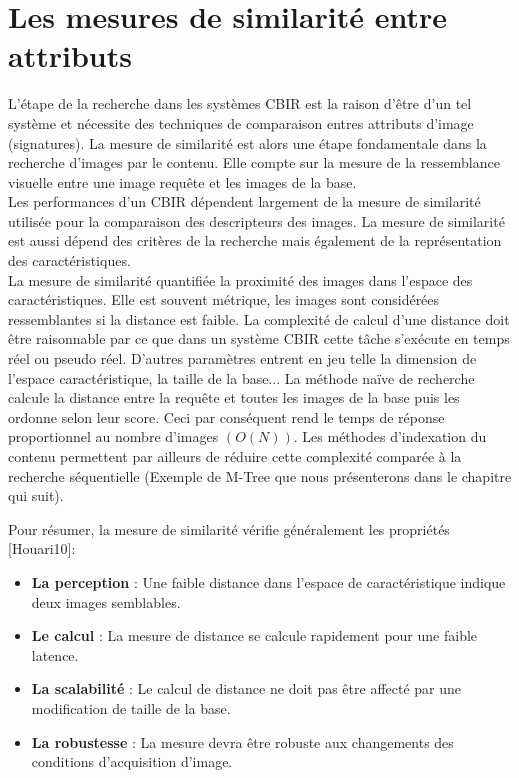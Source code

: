 \section{Les mesures de similarité entre attributs}
L'étape de la recherche dans les systèmes CBIR est la raison d'être d'un tel système et nécessite des techniques de comparaison entres attributs d'image (signatures). La mesure de similarité est alors une étape fondamentale dans la recherche d'images par le contenu. Elle compte sur la mesure de la ressemblance visuelle entre une image requête et les images de la base.\\

Les performances d'un CBIR dépendent largement de la mesure de similarité utilisée pour la comparaison des descripteurs des images. La mesure de similarité est aussi dépend des critères de la recherche mais également de la représentation des caractéristiques.\\

La mesure de similarité quantifiée la proximité des images dans l'espace des caractéristiques. Elle est souvent métrique, les images sont considérées ressemblantes si la distance est faible. La complexité de calcul d'une distance doit être raisonnable par ce que dans un système CBIR cette tâche s'exécute en temps réel ou pseudo réel. D'autres paramètres entrent en jeu telle la dimension de l'espace caractéristique, la taille de la base... La méthode naïve de recherche calcule la distance entre la requête et toutes les images de la base puis les ordonne selon leur score. Ceci par conséquent rend le temps de réponse proportionnel au nombre d'images $ (O(N)) $. Les méthodes d'indexation du contenu permettent par ailleurs de réduire cette complexité comparée à la recherche séquentielle (Exemple de M-Tree que nous présenterons dans le chapitre qui suit). 

Pour résumer, la mesure de similarité vérifie généralement les propriétés [Houari10]:

\begin{itemize}
	\item  \textbf{La perception} : Une faible distance dans l'espace de caractéristique indique deux images semblables.
	
	\item \textbf{Le calcul} : La mesure de distance se calcule rapidement pour une faible latence.
	
	\item \textbf{La scalabilité }: Le calcul de distance ne doit pas être affecté par une modification de taille de la base.
	
	\item \textbf{La robustesse} : La mesure devra être robuste aux changements des conditions d'acquisition d'image.
\end{itemize}


